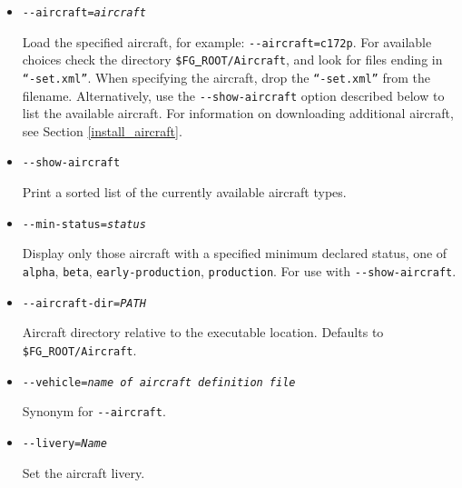 \begin{itemize}
\item{\texttt{-$ $-aircraft={\it aircraft}}}

Load the specified aircraft, for example: \texttt{-$ $-aircraft=c172p}. For available choices
check the directory \texttt{\$FG\underline{~}ROOT/Aircraft}, and look for files ending in \texttt{``-set.xml''}.
When specifying the aircraft, drop the \texttt{``-set.xml''} from the filename. Alternatively, use
the \texttt{-$ $-show-aircraft} option described below to list the available aircraft. For information
on downloading additional aircraft, see Section \ref{install_aircraft}.

\item{\texttt{-$ $-show-aircraft}}

Print a sorted list of the currently available aircraft types.

\item{\texttt{-$ $-min-status={\it status}}}

Display only those aircraft with a specified minimum declared status, one of
\texttt{alpha}, \texttt{beta}, \texttt{early-production}, \texttt{production}. For use with \texttt{-$ $-show-aircraft}.

\item{\texttt{-$ $-aircraft-dir={\it PATH}}}

Aircraft directory relative to the executable location. Defaults to \texttt{\$FG\underline{~}ROOT/Aircraft}.

\item{\texttt{-$ $-vehicle={\it name of aircraft definition file}}}

Synonym for \texttt{-$ $-aircraft}.

\item{\texttt{-$ $-livery={\it Name}}}

Set the aircraft livery.

\end{itemize}

